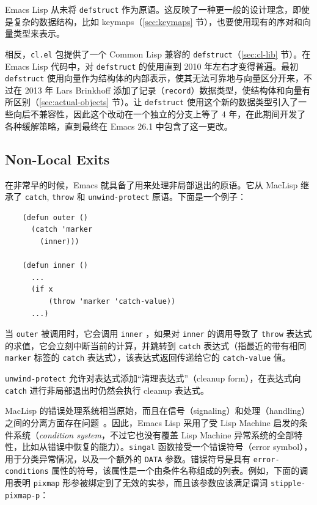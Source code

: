 \documentclass[format=acmsmall,screen]{acmart}
\begin{document}
Emacs Lisp 从未将 \texttt{defstruct} 作为原语。这反映了一种更一般的设计理念，即使是复杂的数据结构，比如 keymaps（\ref{sec:keymaps} 节），也要使用现有的序对和向量类型来表示。

相反，\texttt{cl.el} 包提供了一个 Common Lisp 兼容的 \texttt{defstruct}（\ref{sec:cl-lib} 节）。在 Emacs Lisp 代码中，对 \texttt{defstruct} 的使用直到 2010 年左右才变得普遍。最初 \texttt{defstruct} 使用向量作为结构体的内部表示，使其无法可靠地与向量区分开来，不过在 2013 年 Lars Brinkhoff 添加了记录（\texttt{record}）数据类型，使结构体和向量有所区别（\ref{sec:actual-objects} 节）。让 \texttt{defstruct} 使用这个新的数据类型引入了一些向后不兼容性，因此这个改动在一个独立的分支上等了 4 年，在此期间开发了各种缓解策略，直到最终在 Emacs 26.1 中包含了这一更改。

\subsection{Non-Local Exits}
\label{sec:non-local-exits}

在非常早的时候，Emacs 就具备了用来处理非局部退出的原语。它从 MacLisp 继承了 \texttt{catch}, \texttt{throw} 和 \texttt{unwind-protect} 原语。下面是一个例子：
%
\begin{verbatim}
    (defun outer ()
      (catch 'marker
        (inner)))

    (defun inner ()
      ...
      (if x
          (throw 'marker 'catch-value))
      ...)
\end{verbatim}
%
当 \texttt{outer} 被调用时，它会调用 \texttt{inner} ，如果对 \texttt{inner} 的调用导致了 \texttt{throw} 表达式的求值，它会立刻中断当前的计算，并跳转到 \texttt{catch} 表达式（指最近的带有相同 \texttt{marker} 标签的 \texttt{catch} 表达式），该表达式返回传递给它的 \texttt{catch-value} 值。

\texttt{unwind-protect} 允许对表达式添加“清理表达式”（cleanup form），在表达式向 \texttt{catch} 进行非局部退出时仍然会执行 cleanup 表达式。

MacLisp 的错误处理系统相当原始，而且在信号（signaling）和处理（handling）之间的分离方面存在问题~\cite{Pitman2001}。因此，Emacs Lisp 采用了受 Lisp Machine 启发的条件系统（\emph{condition system}，不过它也没有覆盖 Lisp Machine 异常系统的全部特性，比如从错误中恢复的能力）。\texttt{singal} 函数接受一个错误符号（error symbol），用于分类异常情况，以及一个额外的 \texttt{DATA} 参数。错误符号是具有 \texttt{error-conditions} 属性的符号，该属性是一个由条件名称组成的列表。例如，下面的调用表明 \texttt{pixmap} 形参被绑定到了无效的实参，而且该参数应该满足谓词 \texttt{stipple-pixmap-p}：
\end{document}

